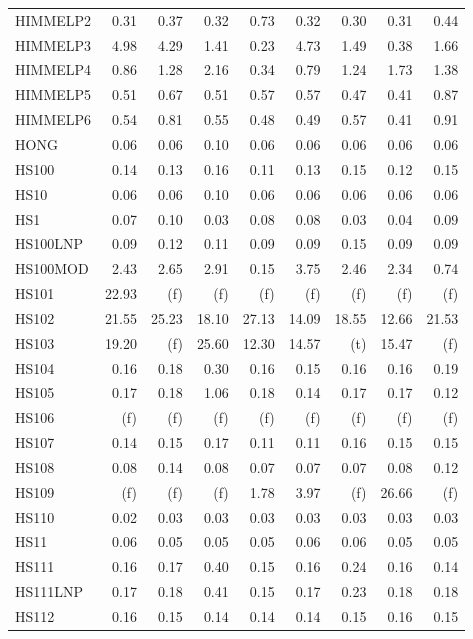 \documentclass[11pt,twoside]{article}
\begin{document}
{\begin{longtable}[c]{|l|r|r|r|r|r|r|r|r|}
HIMMELP2 & 0.31 & 0.37 & 0.32 & 0.73 & 0.32 & 0.30 & 0.31 & 0.44 \\
HIMMELP3 & 4.98 & 4.29 & 1.41 & 0.23 & 4.73 & 1.49 & 0.38 & 1.66 \\
HIMMELP4 & 0.86 & 1.28 & 2.16 & 0.34 & 0.79 & 1.24 & 1.73 & 1.38 \\
HIMMELP5 & 0.51 & 0.67 & 0.51 & 0.57 & 0.57 & 0.47 & 0.41 & 0.87 \\
HIMMELP6 & 0.54 & 0.81 & 0.55 & 0.48 & 0.49 & 0.57 & 0.41 & 0.91 \\
HONG & 0.06 & 0.06 & 0.10 & 0.06 & 0.06 & 0.06 & 0.06 & 0.06 \\
HS100 & 0.14 & 0.13 & 0.16 & 0.11 & 0.13 & 0.15 & 0.12 & 0.15 \\
HS10 & 0.06 & 0.06 & 0.10 & 0.06 & 0.06 & 0.06 & 0.06 & 0.06 \\
HS1 & 0.07 & 0.10 & 0.03 & 0.08 & 0.08 & 0.03 & 0.04 & 0.09 \\
HS100LNP & 0.09 & 0.12 & 0.11 & 0.09 & 0.09 & 0.15 & 0.09 & 0.09 \\
HS100MOD & 2.43 & 2.65 & 2.91 & 0.15 & 3.75 & 2.46 & 2.34 & 0.74 \\
HS101 & 22.93 & (f) & (f) & (f) & (f) & (f) & (f) & (f) \\
HS102 & 21.55 & 25.23 & 18.10 & 27.13 & 14.09 & 18.55 & 12.66 & 21.53 \\
HS103 & 19.20 & (f) & 25.60 & 12.30 & 14.57 & (t) & 15.47 & (f) \\
HS104 & 0.16 & 0.18 & 0.30 & 0.16 & 0.15 & 0.16 & 0.16 & 0.19 \\
HS105 & 0.17 & 0.18 & 1.06 & 0.18 & 0.14 & 0.17 & 0.17 & 0.12 \\
HS106 & (f) & (f) & (f) & (f) & (f) & (f) & (f) & (f) \\
HS107 & 0.14 & 0.15 & 0.17 & 0.11 & 0.11 & 0.16 & 0.15 & 0.15 \\
HS108 & 0.08 & 0.14 & 0.08 & 0.07 & 0.07 & 0.07 & 0.08 & 0.12 \\
HS109 & (f) & (f) & (f) & 1.78 & 3.97 & (f) & 26.66 & (f) \\
HS110 & 0.02 & 0.03 & 0.03 & 0.03 & 0.03 & 0.03 & 0.03 & 0.03 \\
HS11 & 0.06 & 0.05 & 0.05 & 0.05 & 0.06 & 0.06 & 0.05 & 0.05 \\
HS111 & 0.16 & 0.17 & 0.40 & 0.15 & 0.16 & 0.24 & 0.16 & 0.14 \\
HS111LNP & 0.17 & 0.18 & 0.41 & 0.15 & 0.17 & 0.23 & 0.18 & 0.18 \\
HS112 & 0.16 & 0.15 & 0.14 & 0.14 & 0.14 & 0.15 & 0.16 & 0.15 \\

\end{longtable}}
\end{document}
